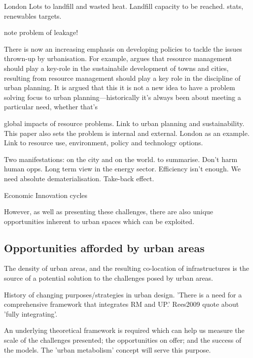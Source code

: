 London
\citep{Zabel2011} Lots to landfill and wasted heat.
\citep{Geng2010} Landfill capacity to be reached.
\citep{Keirstead2012} stats, renewables targets.

note problem of leakage!

There is now an increasing emphasis on developing policies to tackle the issues thrown-up by urbanisation. For example, \citet{Agudelo-Vera2011} argues that resource management should play a key-role in the sustainabile development of towns and cities, resulting from resource management should play a key role in the discipline of urban planning. It is argued that this it is not a new idea to have a problem solving focus to urban planning---historically it's always been about meeting a particular need, whether that's 

\citep{Agudelo-Vera2011} global impacts of resource problems. Link to urban planning and sustainability. This paper also sets the problem is internal and external.
London as an example. 
\citep{Chen2006} Link to resource use, environment, policy and technology options.

Two manifestations: on the city and on the world.
\citep{Batt2010} to summarise.
\citep{Newman1999} Don't harm human opps.
\citep{Sirikitputtisak} Long term view in the energy sector.
\citep{Winiwater2011} Efficiency isn't enough. We need absolute dematerialisation. Take-back effect.


Economic
\citep{Bettencourt2007} Innovation cycles


However, as well as presenting these challenges, there are also unique opportunities inherent to urban spaces which can be exploited.

\subsection{Opportunities afforded by urban areas}
The density of urban areas, and the resulting co-location of infrastructures is the source of a potential solution to the challenges posed by urban areas.

\citep{Agudelo-Vera2011} History of changing purposes/strategies in urban design. 
'There is a need for a comprehensive framework that integrates RM and UP.'
Rees2009 quote about 'fully integrating'.

An underlying theoretical framework is required which can help us measure the scale of the challenges presented; the opportunities on offer; and the success of the models. The 'urban metabolism' concept will serve this purpose.

